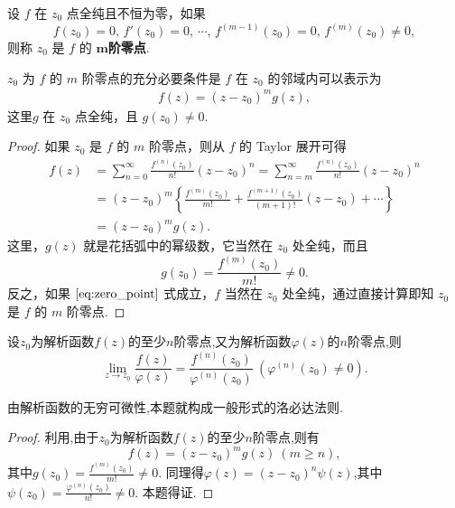 \documentclass[../../main.tex]{subfiles}%
\begin{document}
\begin{definition}
设 \( f \) 在 \( z_0 \) 点全纯且不恒为零，如果
\[
f(z_0) = 0, \, f'(z_0) = 0, \, \cdots, \, f^{(m - 1)}(z_0) = 0, \, f^{(m)}(z_0) \neq 0,
\]
则称 \( z_0 \) 是 \( f \) 的 $\boldsymbol{m}$\textbf{阶零点}.
\end{definition}

\begin{theorem}\label{theorem:复变函数-----定理4.3.4}
\( z_0 \) 为 \( f \) 的 \( m \) 阶零点的充分必要条件是 \( f \) 在 \( z_0 \) 的邻域内可以表示为
\begin{align}
f(z) = (z - z_0)^m g(z), \label{eq:zero_point}
\end{align}
这里\( g \) 在 \( z_0 \) 点全纯，且 \( g(z_0) \neq 0 \).
\end{theorem}
\begin{proof}

如果 \( z_0 \) 是 \( f \) 的 \( m \) 阶零点，则从 \( f \) 的 Taylor 展开可得
\begin{align*}
f(z) &= \sum_{n=0}^{\infty} \frac{f^{(n)}(z_0)}{n!} (z - z_0)^n = \sum_{n=m}^{\infty} \frac{f^{(n)}(z_0)}{n!} (z - z_0)^n \\
&= (z - z_0)^m \left\{ \frac{f^{(m)}(z_0)}{m!} + \frac{f^{(m + 1)}(z_0)}{(m + 1)!} (z - z_0) + \cdots \right\} \\
&= (z - z_0)^m g(z).
\end{align*}
这里，\( g(z) \) 就是花括弧中的幂级数，它当然在 \( z_0 \) 处全纯，而且
\[
g(z_0) = \frac{f^{(m)}(z_0)}{m!} \neq 0.
\]
反之，如果 \(\eqref{eq:zero_point}\) 式成立，\( f \) 当然在 \( z_0 \) 处全纯，通过直接计算即知 \( z_0 \) 是 \( f \) 的 \( m \) 阶零点.

\end{proof}

\begin{theorem}\label{theorem:解析函数一般形式的L'Hospital法则}
设$z_0$为解析函数$f(z)$的至少$n$阶零点,又为解析函数$\varphi(z)$的$n$阶零点,则
$$\lim\limits_{z \to z_0} \frac{f(z)}{\varphi(z)} = \frac{f^{(n)}(z_0)}{\varphi^{(n)}(z_0)} \ (\varphi^{(n)}(z_0) \neq 0).$$
\end{theorem}
\begin{remark}
由解析函数的无穷可微性,本题就构成一般形式的洛必达法则.
\end{remark}
\begin{proof}

利用,由于$z_0$为解析函数$f(z)$的至少$n$阶零点,则有
$$f(z) = (z - z_0)^m g(z) \ (m \geqslant n),$$
其中$g(z_0) = \frac{f^{(m)}(z_0)}{m!} \neq 0.$
同理得$\varphi(z) = (z - z_0)^n \psi(z)$,其中$\psi(z_0) = \frac{\varphi^{(n)}(z_0)}{n!} \neq 0.$
本题得证.

\end{proof}
\end{document}
